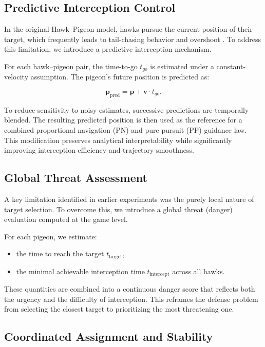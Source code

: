 \documentclass[a4paper,11pt,twocolumn]{article}
\begin{document}
\subsection{Predictive Interception Control}

In the original Hawk--Pigeon model, hawks pursue the current position of their target, which frequently leads to tail-chasing behavior and overshoot \cite{brighton2019hawks}. To address this limitation, we introduce a predictive interception mechanism.

For each hawk--pigeon pair, the time-to-go $t_{go}$ is estimated under a constant-velocity assumption. The pigeon’s future position is predicted as:

\[
\mathbf{p}_{\text{pred}} = \mathbf{p} + \mathbf{v} \cdot t_{go}.
\]

To reduce sensitivity to noisy estimates, successive predictions are temporally blended. The resulting predicted position is then used as the reference for a combined proportional navigation (PN) and pure pursuit (PP) guidance law. This modification preserves analytical interpretability while significantly improving interception efficiency and trajectory smoothness.

\subsection{Global Threat Assessment}

A key limitation identified in earlier experiments was the purely local nature of target selection. To overcome this, we introduce a global threat (danger) evaluation computed at the game level.

For each pigeon, we estimate:
\begin{itemize}
    \item the time to reach the target $t_{\text{target}}$,
    \item the minimal achievable interception time $t_{\text{intercept}}$ across all hawks.
\end{itemize}

These quantities are combined into a continuous danger score that reflects both the urgency and the difficulty of interception. This reframes the defense problem from selecting the closest target to prioritizing the most threatening one.

\subsection{Coordinated Assignment and Stability}
\end{document}

